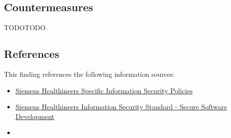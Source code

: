 \subsection*{Countermeasures}

TODOTODO.


\subsection*{References}

This finding references the following information sources:

\begin{itemize}
	\item \href{https://healthineers.sharepoint.com/sites/Cybersec/Shared%20Documents/Forms/Sorted%20by%20Systems.aspx?FolderCTID=0x012000ED5B594E8968A843965BAF67795EC3FF&FilterField1=System&FilterValue1=&FilterType1=Text&id=%2Fsites%2FCybersec%2FShared%20Documents%2FCYSMS%2FIT%20Security%20Regulations%2FSHS%20Information%20Security%20Controls%2FSHS%5FISEC%5FC%5F01%2Epdf&parent=%2Fsites%2FCybersec%2FShared%20Documents%2FCYSMS%2FIT%20Security%20Regulations%2FSHS%20Information%20Security%20Controls}{Siemens Healthineers Specific Information Security Policies}
	\item \href{https://healthineers.sharepoint.com/sites/Cybersec/Shared%20Documents/Forms/Sorted%20by%20Systems.aspx?id=%2Fsites%2FCybersec%2FShared%20Documents%2FCYSMS%2FIT%20Security%20Regulations%2FSHS%20Information%20Security%20Standards%2FSHS%5FISEC%5FS%5F05%5FSecure%5FSoftware%5FDevelopment%2Epdf&parent=%2Fsites%2FCybersec%2FShared%20Documents%2FCYSMS%2FIT%20Security%20Regulations%2FSHS%20Information%20Security%20Standards}{Siemens Healthineers Information Security Standard - Secure Software Development}
	\item {}
\end{itemize}


